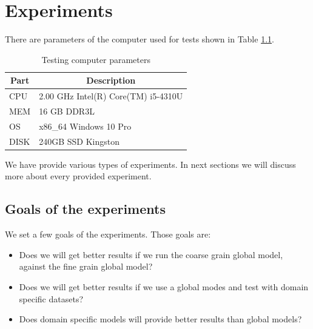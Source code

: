 \documentclass[thesis=M,english]{FITthesis}[2018/05/30]
\begin{document}
 
\chapter{Experiments}

There are parameters of the computer used for tests shown in Table \ref{tab:PCparam}.
\begin{table}[H]\centering
	\caption{Testing computer parameters}
	\label{tab:PCparam}
	\begin{tabular}{|l|l|}
	\hline \multicolumn{1}{|c|}{\textbf{Part}} & \multicolumn{1}{|c|}{\textbf{Description}} \\\hline
	CPU & 2.00 GHz Intel(R) Core(TM) i5-4310U \\
	MEM & 16 GB DDR3L\\
	OS & x86\_64 Windows 10 Pro\\
	DISK & 240GB SSD Kingston\\\hline
	\end{tabular}
\end{table}


We have provide various types of experiments. In next sections we will discuss more about every provided experiment.

\section{Goals of the experiments}
	We set a few goals of the experiments. Those goals are:

\begin{itemize}
	\item Does we will get better results if we run the coarse grain global model, against the fine grain global model?
	\item Does we will get better results if we use a global modes and test with domain specific datasets?
	\item Does domain specific models will provide better results than global models?
\end{itemize}

	
\end{document}
